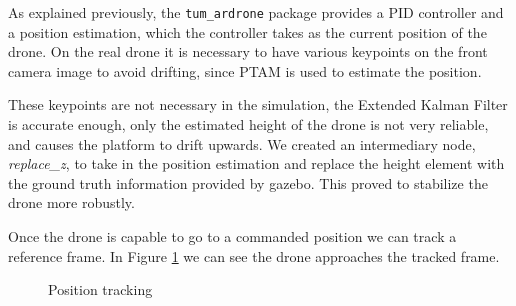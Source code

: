 \documentclass[11pt,a4paper]{article}
\begin{document}
As explained previously, the \verb!tum_ardrone! package provides a PID controller and a position estimation, which the controller takes as the current position of the drone. On the real drone it is necessary to have various keypoints on the front camera image to avoid drifting, since PTAM is used to estimate the position.

These keypoints are not necessary in the simulation, the Extended Kalman Filter is accurate enough, only the estimated height of the drone is not very reliable, and causes the platform to drift upwards. We created an intermediary node, \textit{replace\_z}, to take in the position estimation and replace the height element with the ground truth information provided by gazebo. This proved to stabilize the drone more robustly.

Once the drone is capable to go to a commanded position we can track a reference frame. In Figure \ref{fig:posT} we can see the drone approaches the tracked frame.

\begin{figure}[ht!]%
	\centering
    \qquad  
    \caption{Position tracking}
    \label{fig:posT}
\end{figure}
\end{document}
